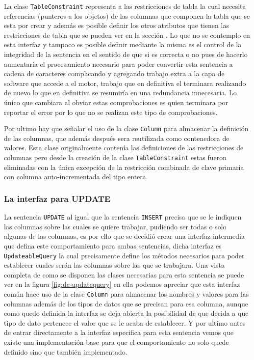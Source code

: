 La clase \verb=TableConstraint= representa a las restricciones de tabla la cual necesita referencias (punteros a los objetos) de las columnas que componen la tabla que se esta por crear y además es posible definir los otros atributos que tienen las restricciones de tabla que se pueden ver en la sección  . Lo que no se contemplo en esta interfaz y tampoco es posible definir mediante la misma es el control de la integridad de la sentencia en el sentido de que si es correcta o no pues de hacerlo aumentaría el procesamiento necesario para poder convertir esta sentencia a cadena de caracteres complicando y agregando trabajo extra a la capa de software que accede a el motor, trabajo que en definitiva el terminara realizando de nuevo lo que en definitiva se resumiría en una redundancia innecesaria. Lo único que cambiara al obviar estas comprobaciones es quien terminara por reportar el error por lo que no se realizan este tipo de comprobaciones.

Por ultimo hay que señalar el uso de la clase \verb=Column= para almacenar la definición de las columnas, que además después sera reutilizada como contenedora de valores. Esta clase originalmente contenía las definiciones de las restricciones de columnas pero desde la creación de la clase \verb=TableConstraint= estas fueron eliminadas con la única excepción de la restricción combinada de clave primaria con columna  auto-incrementada del tipo entera.

\subsubsection{La interfaz para UPDATE}
La sentencia \verb=UPDATE= al igual que la sentencia \verb=INSERT= precisa que se le indiquen las columnas sobre las cuales se quiere trabajar, pudiendo ser todas o solo algunas de las columnas, es por ello que se decidió crear una interfaz intermedia que defina este comportamiento para ambas sentencias, dicha interfaz es \verb=UpdateableQuery= la cual precisamente define los métodos necesarios para poder establecer cuales serán las columnas sobre las que se trabajara. Una vista completa de como se disponen las clases necesarias para esta sentencia se puede ver en la figura \ref{fig:dc-updatequery} en ella podemos apreciar que esta interfaz común hace uso de la clase \verb=Column= para almacenar los nombres y valores para las columnas además de los tipos de datos que se precisan para esa columna, aunque como quedo definida la interfaz se deja abierta la posibilidad de que \jj decida a que tipo de dato pertenece el valor que se le acaba de establecer. Y por ultimo antes de entrar directamente a la interfaz especifica para esta sentencia vemos que existe una implementación base para que el comportamiento no solo quede definido sino que también implementado. 

